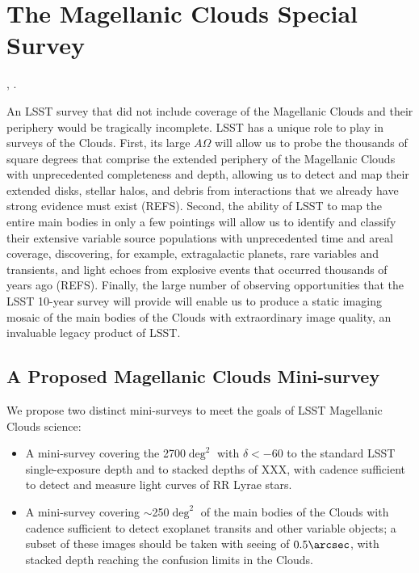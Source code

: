 %
%
%

\section{The Magellanic Clouds Special Survey}
\def\secname{mc}\label{sec:\secname}

,
.

An LSST survey that did not include coverage of the Magellanic Clouds
and their periphery would be tragically incomplete.  LSST has a unique
role to play in surveys of the Clouds.  First, its large $A\Omega$
will allow us to probe the thousands of square degrees that comprise
the extended periphery of the Magellanic Clouds with unprecedented
completeness and depth, allowing us to detect and map their extended
disks, stellar halos, and debris from interactions that we already
have strong evidence must exist (REFS).  Second, the ability of LSST
to map the entire main bodies in only a few pointings will allow us to
identify and classify their extensive variable source populations with
unprecedented time and areal coverage, discovering, for example,
extragalactic planets, rare variables and transients, and light echoes
from explosive events that occurred thousands of years ago (REFS).
Finally, the large number of observing opportunities that the LSST
10-year survey will provide will enable us to produce a static imaging
mosaic of the main bodies of the Clouds with extraordinary image
quality, an invaluable legacy product of LSST.


\subsection{A Proposed Magellanic Clouds Mini-survey}
\label{sec:\secname:proposal}

We propose two distinct mini-surveys to meet the goals of LSST
Magellanic Clouds science:
\begin{itemize}
\item A mini-survey covering the 2700$\deg^2$ with $\delta < -60$ to
the standard LSST single-exposure depth and to stacked depths of XXX,
with cadence sufficient to detect and measure light curves of RR Lyrae
stars.
\item A mini-survey covering $\sim$250$\deg^2$ of the main bodies of
the Clouds with cadence sufficient to detect exoplanet transits and
other variable objects; a subset of these images should be taken with
seeing of $0.5\arcsec$, with stacked depth reaching the confusion
limits in the Clouds.
\end{itemize}

